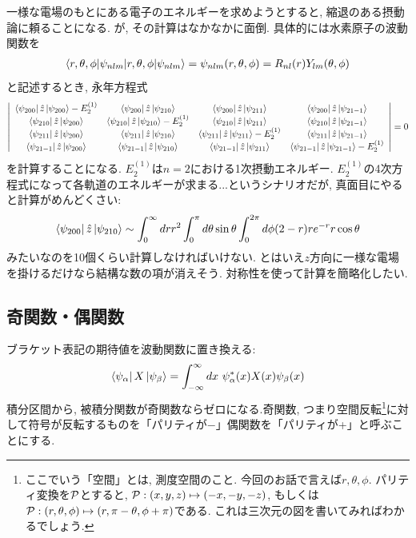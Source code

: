 \documentclass[10.5pt,a4paper]{jreport}
\begin{document}
一様な電場のもとにある電子のエネルギーを求めようとすると, 縮退のある摂動論に頼ることになる. が, その計算はなかなかに面倒. 具体的には水素原子の波動関数を
\begin{eqnarray}
  \braket{r, \theta, \phi|\psi_{nlm}} = \psi_{nlm}(r, \theta, \phi) = R_{nl}(r)Y_{lm}(\theta, \phi)
\end{eqnarray}
と記述するとき, 永年方程式
\begin{eqnarray}
  \left|
\nonumber    \begin{array}{cccc}
      \bra{\psi_{200}}\hat{z}\ket{\psi_{200}}-E^{(1)}_2 & \bra{\psi_{200}}\hat{z}\ket{\psi_{210}} & \bra{\psi_{200}}\hat{z}\ket{\psi_{211}}& \bra{\psi_{200}}\hat{z}\ket{\psi_{21-1}} \\
      \bra{\psi_{210}}\hat{z}\ket{\psi_{200}} & \bra{\psi_{210}}\hat{z}\ket{\psi_{210}}-E^{(1)}_2 & \bra{\psi_{210}}\hat{z}\ket{\psi_{211}} & \bra{\psi_{210}}\hat{z}\ket{\psi_{21-1}}\\
      \bra{\psi_{211}}\hat{z}\ket{\psi_{200}} & \bra{\psi_{211}}\hat{z}\ket{\psi_{210}} & \bra{\psi_{211}}\hat{z}\ket{\psi_{211}}-E^{(1)}_2 &\bra{\psi_{211}}\hat{z}\ket{\psi_{21-1}}\\
      \bra{\psi_{21-1}}\hat{z}\ket{\psi_{200}} &\bra{\psi_{21-1}}\hat{z}\ket{\psi_{210}} & \bra{\psi_{21-1}}\hat{z}\ket{\psi_{211}} &\bra{\psi_{21-1}}\hat{z}\ket{\psi_{21-1}}-E^{(1)}_2
    \end{array}
  \right|=0\\
\end{eqnarray}
を計算することになる. $E_2^{(1)}$は$n=2$における1次摂動エネルギー. $E_2^{(1)}$の4次方程式になって各軌道のエネルギーが求まる...というシナリオだが, 真面目にやると計算がめんどくさい:
\begin{eqnarray}
  \bra{\psi_{200}}\hat{z}\ket{\psi_{210}} \sim \int_0^\infty dr r^2\int_0^\pi d\theta \sin{\theta}\int_0^{2\pi} d\phi(2-r)re^{-r}r\cos{\theta}
\end{eqnarray}
みたいなのを10個くらい計算しなければいけない. とはいえ$z$方向に一様な電場を掛けるだけなら結構な数の項が消えそう. 対称性を使って計算を簡略化したい.
\subsection{奇関数・偶関数}
ブラケット表記の期待値を波動関数に置き換える:
\begin{eqnarray}
  \bra{\psi_\alpha}X\ket{\psi_\beta} = \int_{-\infty}^\infty dx\ \psi^*_\alpha(x) X(x)\psi_\beta(x)
\end{eqnarray}
積分区間から, 被積分関数が奇関数ならゼロになる.奇関数, つまり空間反転\footnote{ここでいう「空間」とは, 測度空間のこと. 今回のお話で言えば$r, \theta, \phi$. パリティ変換を${\cal P}$とすると, ${\cal P}:(x, y, z)\mapsto (-x, -y, -z)$, もしくは${\cal P}:(r, \theta, \phi)\mapsto (r, \pi-\theta, \phi + \pi)$である. これは三次元の図を書いてみればわかるでしょう.}に対して符号が反転するものを「パリティが$-$」偶関数を「パリティが+」と呼ぶことにする.
\end{document}
